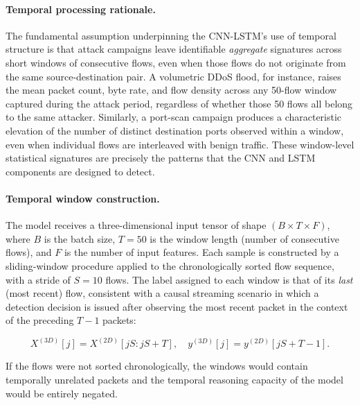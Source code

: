 \documentclass[../main.tex]{subfiles}
\begin{document}
\paragraph{Temporal processing rationale.}
The fundamental assumption underpinning the CNN-LSTM's use of temporal structure is that attack campaigns leave identifiable \emph{aggregate} signatures across short windows of consecutive flows, even when those flows do not originate from the same source-destination pair.  A volumetric DDoS flood, for instance, raises the mean packet count, byte rate, and flow density across any 50-flow window captured during the attack period, regardless of whether those 50 flows all belong to the same attacker.  Similarly, a port-scan campaign produces a characteristic elevation of the number of distinct destination ports observed within a window, even when individual flows are interleaved with benign traffic.  These window-level statistical signatures are precisely the patterns that the CNN and LSTM components are designed to detect.

\paragraph{Temporal window construction.}
The model receives a three-dimensional input tensor of shape $(B \times T \times F)$, where $B$ is the batch size, $T = 50$ is the window length (number of consecutive flows), and $F$ is the number of input features.  Each sample is constructed by a sliding-window procedure applied to the chronologically sorted flow sequence, with a stride of $S = 10$ flows.  The label assigned to each window is that of its \emph{last} (most recent) flow, consistent with a causal streaming scenario in which a detection decision is issued after observing the most recent packet in the context of the preceding $T-1$ packets:

\[
    X^{(3D)}[j] = X^{(2D)}[jS : jS + T], \quad y^{(3D)}[j] = y^{(2D)}[jS + T - 1].
\]

If the flows were not sorted chronologically, the windows would contain temporally unrelated packets and the temporal reasoning capacity of the model would be entirely negated.
\end{document}
